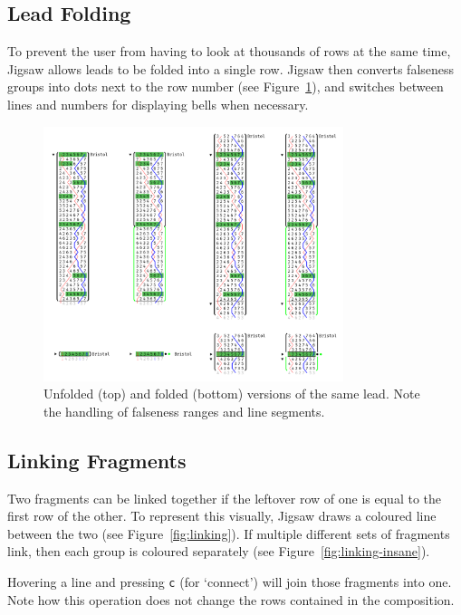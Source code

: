 \documentclass[12pt]{article}
\begin{document}
\subsection{Lead Folding}

To prevent the user from having to look at thousands of rows at the same time, Jigsaw allows leads
to be folded into a single row.  Jigsaw then converts falseness groups into dots next to the row
number (see Figure~\ref{fig:lead-folding}), and switches between lines and numbers for displaying
bells when necessary.

\begin{figure}
    \centering
    \includegraphics[width=0.78\textwidth]{folding-full}
    \caption{Unfolded (top) and folded (bottom) versions of the same lead.  Note the handling of
    falseness ranges and line segments.}\label{fig:lead-folding}
\end{figure}

\subsection{Linking Fragments}

Two fragments can be linked together if the leftover row of one is equal to the first row of the
other.  To represent this visually, Jigsaw draws a coloured line between the two (see
Figure~\ref{fig:linking}).  If multiple different sets of fragments link, then each group is
coloured separately (see Figure~\ref{fig:linking-insane}).

Hovering a line and pressing \verb|c| (for `connect') will join those fragments into one.  Note how
this operation does not change the rows contained in the composition.
\end{document}

